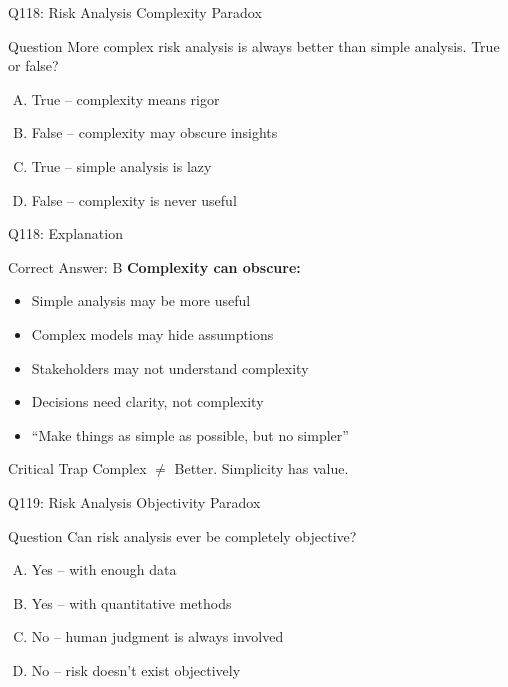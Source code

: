 \documentclass{beamer}
\begin{document}
	\begin{frame}{Q118: Risk Analysis Complexity Paradox}
		\begin{block}{Question}
			More complex risk analysis is always better than simple analysis. True or false?
		\end{block}
		\begin{enumerate}[(A)]
			\item True -- complexity means rigor
			\item False -- complexity may obscure insights
			\item True -- simple analysis is lazy
			\item False -- complexity is never useful
		\end{enumerate}
	\end{frame}
	
	\begin{frame}{Q118: Explanation}
		\begin{block}{Correct Answer: B}
			\textbf{Complexity can obscure:}
			\begin{itemize}
				\item Simple analysis may be more useful
				\item Complex models may hide assumptions
				\item Stakeholders may not understand complexity
				\item Decisions need clarity, not complexity
				\item ``Make things as simple as possible, but no simpler''
			\end{itemize}
		\end{block}
		\begin{alertblock}{Critical Trap}
			Complex $\neq$ Better. Simplicity has value.
		\end{alertblock}
	\end{frame}
	
	\begin{frame}{Q119: Risk Analysis Objectivity Paradox}
		\begin{block}{Question}
			Can risk analysis ever be completely objective?
		\end{block}
		\begin{enumerate}[(A)]
			\item Yes -- with enough data
			\item Yes -- with quantitative methods
			\item No -- human judgment is always involved
			\item No -- risk doesn't exist objectively
		\end{enumerate}
	\end{frame}
	
\end{document}
